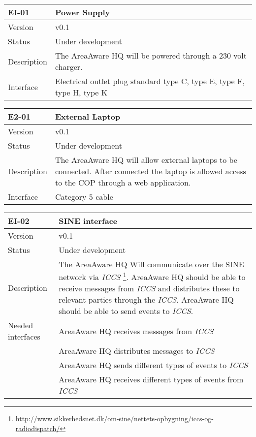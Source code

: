 \begin{longtable}{| p{3.5cm} |  p{10cm} | }
	\hline
	\textbf{EI-01} &  \textbf{Power Supply} \\
	\hline
	Version & v0.1 \\
	\hline
	Status & Under development \\
	\hline
	Description & The AreaAware HQ will be powered through a 230 volt charger.	\\
	\hline
	Interface &  Electrical outlet plug standard type C, type E,  type F,  type H, type K \\
	\hline
\end{longtable}

\begin{longtable}{| p{3.5cm} |  p{10cm} | }
	\hline
	\textbf{E2-01} &  \textbf{External Laptop} \\
	\hline
	Version & v0.1 \\
	\hline
	Status & Under development \\
	\hline
	Description & The AreaAware HQ will allow external laptops to be connected. After connected the laptop is allowed access to the COP through a web application.	\\
	\hline
	Interface & Category 5 cable \\
	\hline
\end{longtable}

\begin{longtable}{| p{3.5cm} |  p{10cm} | }
	\hline
	\textbf{EI-02} &  \textbf{SINE interface} \\
	\hline
	Version & v0.1 \\
	\hline
	Status & Under development \\
	\hline
	Description & The AreaAware HQ Will communicate over the SINE network via \emph{ICCS} \footnote{\url{http://www.sikkerhedsnet.dk/om-sine/nettets-opbygning/iccs-og-radiodispatch/}}. AreaAware HQ should be able to receive messages from \emph{ICCS} and distributes these to relevant parties through the \emph{ICCS}. AreaAware HQ should be able to send events to \emph{ICCS}.
	\\
	\hline
	Needed interfaces 
	& AreaAware HQ receives messages from \emph{ICCS} \\
	& AreaAware HQ distributes messages to \emph{ICCS} \\
	& AreaAware HQ sends different types of events to \emph{ICCS} \\
	& AreaAware HQ receives different types of events from \emph{ICCS} \\
	\hline
\end{longtable}

